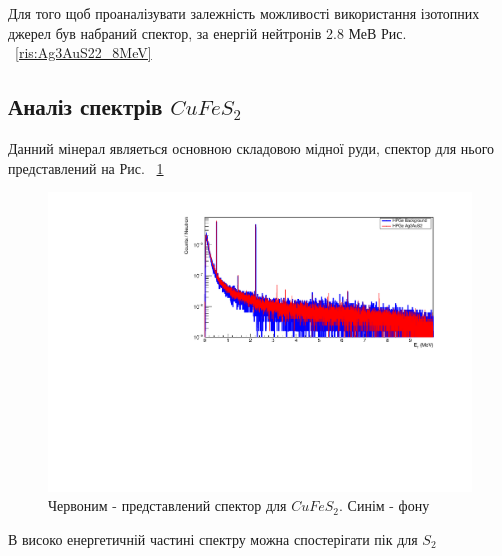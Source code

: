 \documentclass[a4paper, 14pt]{article}
\numberwithin{equation}{section}
\numberwithin{table}{section}
\begin{document}
Для того щоб проаналізувати залежність можливості використання ізотопних джерел був набраний спектор, за енергій нейтронів 2.8 МеВ Рис. ~\ref{ris:Ag3AuS22_8MeV}

\subsection{Аналіз спектрів $CuFeS_2$}
	Данний мінерал являеться основною складовою мідної руди, спектор для нього представлений на Рис. ~\ref{ris:CuFeS_2Fon}
	\begin{figure}[hbt!]
		\centering \includegraphics[width=1\textwidth]{res/smCuFeS2FonAll.pdf}
		\caption{Червоним - представлений спектор для $CuFeS_2$. Синім - фону} 
		\label{ris:CuFeS_2Fon}	
	\end{figure} 	
	В високо енергетичній частині спектру можна спостерігати пік для $S_2$
		
\end{document}
